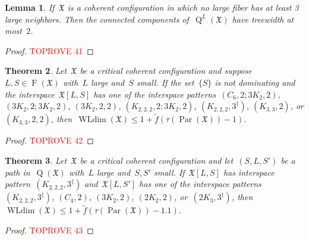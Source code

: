 \documentclass[english,a4paper]{article}
\theoremstyle{plain}
\newtheorem{theorem}             {Theorem}[section]
\newtheorem{lemma}      [theorem]{Lemma}
\theoremstyle{definition}
\DeclareMathOperator{\Fibers}{F}
\newcommand{\coherentConfig}{\ensuremath{\mathfrak{X}}}
\newcommand{\fibers}[1]{\ensuremath{\Fibers \left( #1 \right)}}
\newcommand{\interspace}[2]{\ensuremath{\coherentConfig[#1,#2]}}
\DeclareMathOperator*{\WLdim}{WLdim}
\newcommand{\wldim}[1]{\ensuremath{\WLdim\left(#1\right)}}
\DeclareMathOperator*{\Quotient}{Q}
\newcommand{\quotientGraph}[1]{\ensuremath{\Quotient(#1)}}
\newcommand{\quotientGraphLarge}[1]{\ensuremath{\Quotient^L(#1)}}
\newcommand{\f}{f}
\DeclareMathOperator{\parameters}{Par}
\newcommand{\ipfourMatching}{\ensuremath{(\disjointCliques{2}{2},2)}}
\newcommand{\ipfourCycle}   {\ensuremath{(\cycle{4},2)}}
\newcommand{\ipsixMatching}             {\ensuremath{(\disjointCliques{3}{2},2)}}
\newcommand{\ipsixMatchingTwice}        {\ensuremath{(\disjointCliques{3}{2},2,2)}}
\newcommand{\ipsixMatchingMatching}     {\ensuremath{(\disjointCliques{3}{2},2;\disjointCliques{3}{2},2)}}
\newcommand{\ipsixMatchingAndCycle}     {\ensuremath{(\cycle{6},2;\disjointCliques{3}{2},2)}}
\newcommand{\ipsixMatchingAndComplement}{\ensuremath{(\clique{2,2,2},2;\disjointCliques{3}{2},2)}}
\newcommand{\ipsixTriangle}               {\ensuremath{(\disjointCliques{2}{3},3^\dag)}}
\newcommand{\ipsixTriangleComplement}     {\ensuremath{(\clique{3,3},2)}}
\newcommand{\ipsixTriangleComplementTwice}{\ensuremath{(\clique{3,3},2,2)}}
\newcommand{\ipsixMatchingComplement} {\ensuremath{(\clique{2,2,2},3^\dag)}}
\newcommand{\ipsixMatchingComplementD}{\ensuremath{(\clique{2,2,2},3^\ddag)}}
\newcommand{\clique}[1]{\ensuremath{K_{#1}}}
\newcommand{\cycle}[1]{\ensuremath{C_{#1}}}
\newcommand{\disjointCliques}[2]{\ensuremath{#1 \clique{#2}}}
\begin{document}
\begin{lemma}\label{lem:max:degree:2:means:tw:3}
    If~$\coherentConfig$ is a coherent configuration in which no large fiber has at least 3 large neighbors.
    Then the connected components of~$\quotientGraphLarge{\coherentConfig}$ have treewidth at most~$2$.
\end{lemma}

\begin{proof}\textcolor{red}{TOPROVE 41}\end{proof}










\begin{theorem}
\label{local:L-S/thm}
    Let~$\coherentConfig$ be a critical coherent configuration and suppose~$L,S \in \fibers{\coherentConfig}$ with~$L$ large and~$S$ small.
    If the set~$\{S\}$ is not dominating and the interspace~$\interspace{L}{S}$ has one of the interspace patterns~$\ipsixMatchingAndCycle$, $\ipsixMatchingMatching$, $\ipsixMatchingTwice$, $\ipsixMatchingAndComplement$, $\ipsixMatchingComplement$, $\ipsixTriangleComplement$, or $\ipsixTriangleComplementTwice$,
    then~$\wldim{\coherentConfig} \leq 1 + \widetilde{\f}( \tau(\parameters(\coherentConfig)) - 1)$.
\end{theorem}
\begin{proof}\textcolor{red}{TOPROVE 42}\end{proof}










\begin{theorem}
\label{local:S-L-S/thm}
    Let~$\coherentConfig$ be a critical coherent configuration and let~$(S,L,S')$ be a path in~$\quotientGraph{\coherentConfig}$ with~$L$ large and~$S,S'$ small.
    If~$\interspace{L}{S}$ has interspace pattern~$\ipsixMatchingComplementD$ and~$\interspace{L}{S'}$ has one of the interspace patterns~$\ipsixMatchingComplementD$, $\ipfourCycle$, $\ipsixMatching$, $\ipfourMatching$, or~$\ipsixTriangle$,
    then~$\wldim{\coherentConfig} \leq 1 + \widetilde{\f}( \tau(\parameters(\coherentConfig)) - 1.1)$.
\end{theorem}
\begin{proof}\textcolor{red}{TOPROVE 43}\end{proof}
\end{document}
